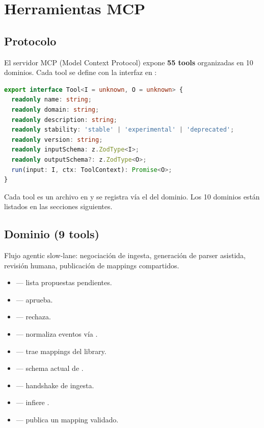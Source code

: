 \chapter{Herramientas MCP}
\label{sec:mcp-tools}

\section{Protocolo}

El servidor MCP (Model Context Protocol) expone \textbf{55 tools}
organizadas en 10 dominios. Cada tool se define con la interfaz
 en :

\begin{lstlisting}[language=TypeScript]
export interface Tool<I = unknown, O = unknown> {
  readonly name: string;
  readonly domain: string;
  readonly description: string;
  readonly stability: 'stable' | 'experimental' | 'deprecated';
  readonly version: string;
  readonly inputSchema: z.ZodType<I>;
  readonly outputSchema?: z.ZodType<O>;
  run(input: I, ctx: ToolContext): Promise<O>;
}
\end{lstlisting}

Cada tool es un archivo en 
y se registra vía el  del dominio. Los 10
dominios están listados en las secciones siguientes.

\section{Dominio  (9 tools)}

Flujo agentic slow-lane: negociación de ingesta, generación de
parser asistida, revisión humana, publicación de mappings
compartidos.

\begin{itemize}
    \item {} — lista propuestas pendientes.
    \item {} — aprueba.
    \item {} — rechaza.
    \item {} — normaliza eventos vía
    .
    \item {} — trae mappings del library.
    \item {} — schema actual de
    .
    \item {} — handshake de ingesta.
    \item {} — infiere .
    \item {} — publica un mapping validado.
\end{itemize}

